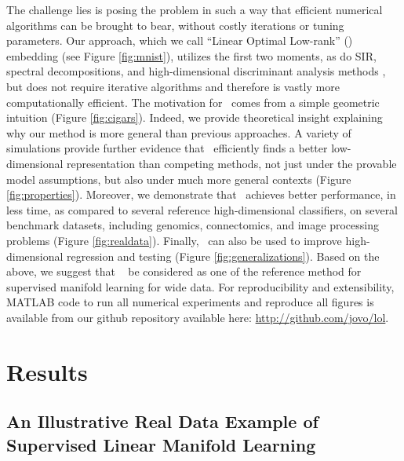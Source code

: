 \documentclass[10pt]{article}
\begin{document}
The challenge lies is posing the problem in such a way that efficient numerical algorithms can be brought to bear, without costly iterations or tuning parameters.  Our approach, which we call ``Linear Optimal Low-rank'' (\Lol) embedding (see Figure \ref{fig:mnist}), utilizes the first two moments, as do SIR, spectral decompositions, and high-dimensional discriminant analysis methods \cite{Bouveyron2007}, but does not require iterative algorithms and therefore is vastly more computationally efficient.  The motivation for \Lol~comes from a simple geometric intuition (Figure \ref{fig:cigars}).  Indeed, we provide  theoretical insight explaining why our method is more general than previous approaches.  A variety of simulations provide further evidence that \Lol~efficiently finds a better low-dimensional representation than competing methods, not just under the provable model assumptions, but also under much more general contexts (Figure \ref{fig:properties}).  Moreover, we demonstrate that \Lol~achieves better performance, in less time, as compared to several reference high-dimensional classifiers, on several benchmark datasets, including genomics, connectomics, and image processing problems (Figure \ref{fig:realdata}). 
Finally, \Lol~can also be used to improve high-dimensional regression and testing (Figure \ref{fig:generalizations}).  
Based on the above, we suggest that \Lol~ be considered as one of the reference method for supervised manifold learning for wide data. 
For reproducibility and extensibility, MATLAB code to run all numerical experiments and reproduce all figures is available from our github repository available here: \url{http://github.com/jovo/lol}. 


\section*{Results}

\subsection*{An Illustrative Real Data Example of Supervised Linear Manifold Learning}
\end{document}
